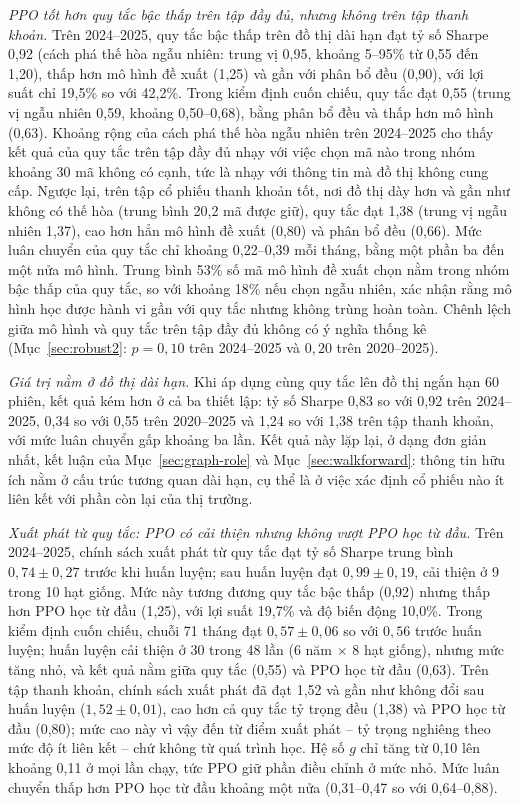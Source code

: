 \textit{PPO tốt hơn quy tắc bậc thấp trên tập đầy đủ, nhưng không trên tập thanh khoản.} Trên 2024--2025, quy tắc bậc thấp trên đồ thị dài hạn đạt tỷ số Sharpe 0,92 (cách phá thế hòa ngẫu nhiên: trung vị 0,95, khoảng 5--95\% từ 0,55 đến 1,20), thấp hơn mô hình đề xuất (1,25) và gần với phân bổ đều (0,90), với lợi suất chỉ 19,5\% so với 42,2\%. Trong kiểm định cuốn chiếu, quy tắc đạt 0,55 (trung vị ngẫu nhiên 0,59, khoảng 0,50--0,68), bằng phân bổ đều và thấp hơn mô hình (0,63). Khoảng rộng của cách phá thế hòa ngẫu nhiên trên 2024--2025 cho thấy kết quả của quy tắc trên tập đầy đủ nhạy với việc chọn mã nào trong nhóm khoảng 30 mã không có cạnh, tức là nhạy với thông tin mà đồ thị không cung cấp. Ngược lại, trên tập cổ phiếu thanh khoản tốt, nơi đồ thị dày hơn và gần như không có thế hòa (trung bình 20,2 mã được giữ), quy tắc đạt 1,38 (trung vị ngẫu nhiên 1,37), cao hơn hẳn mô hình đề xuất (0,80) và phân bổ đều (0,66). Mức luân chuyển của quy tắc chỉ khoảng 0,22--0,39 mỗi tháng, bằng một phần ba đến một nửa mô hình. Trung bình 53\% số mã mô hình đề xuất chọn nằm trong nhóm bậc thấp của quy tắc, so với khoảng 18\% nếu chọn ngẫu nhiên, xác nhận rằng mô hình học được hành vi gần với quy tắc nhưng không trùng hoàn toàn. Chênh lệch giữa mô hình và quy tắc trên tập đầy đủ không có ý nghĩa thống kê (Mục~\ref{sec:robust2}: $p = 0{,}10$ trên 2024--2025 và $0{,}20$ trên 2020--2025).

\textit{Giá trị nằm ở đồ thị dài hạn.} Khi áp dụng cùng quy tắc lên đồ thị ngắn hạn 60 phiên, kết quả kém hơn ở cả ba thiết lập: tỷ số Sharpe 0,83 so với 0,92 trên 2024--2025, 0,34 so với 0,55 trên 2020--2025 và 1,24 so với 1,38 trên tập thanh khoản, với mức luân chuyển gấp khoảng ba lần. Kết quả này lặp lại, ở dạng đơn giản nhất, kết luận của Mục~\ref{sec:graph-role} và Mục~\ref{sec:walkforward}: thông tin hữu ích nằm ở cấu trúc tương quan dài hạn, cụ thể là ở việc xác định cổ phiếu nào ít liên kết với phần còn lại của thị trường.

\textit{Xuất phát từ quy tắc: PPO có cải thiện nhưng không vượt PPO học từ đầu.} Trên 2024--2025, chính sách xuất phát từ quy tắc đạt tỷ số Sharpe trung bình $0{,}74\pm0{,}27$ trước khi huấn luyện; sau huấn luyện đạt $0{,}99\pm0{,}19$, cải thiện ở 9 trong 10 hạt giống. Mức này tương đương quy tắc bậc thấp (0,92) nhưng thấp hơn PPO học từ đầu (1,25), với lợi suất 19,7\% và độ biến động 10,0\%. Trong kiểm định cuốn chiếu, chuỗi 71 tháng đạt $0{,}57\pm0{,}06$ so với $0{,}56$ trước huấn luyện; huấn luyện cải thiện ở 30 trong 48 lần (6 năm $\times$ 8 hạt giống), nhưng mức tăng nhỏ, và kết quả nằm giữa quy tắc (0,55) và PPO học từ đầu (0,63). Trên tập thanh khoản, chính sách xuất phát đã đạt 1,52 và gần như không đổi sau huấn luyện ($1{,}52\pm0{,}01$), cao hơn cả quy tắc tỷ trọng đều (1,38) và PPO học từ đầu (0,80); mức cao này vì vậy đến từ điểm xuất phát -- tỷ trọng nghiêng theo mức độ ít liên kết -- chứ không từ quá trình học. Hệ số $g$ chỉ tăng từ 0,10 lên khoảng 0,11 ở mọi lần chạy, tức PPO giữ phần điều chỉnh ở mức nhỏ. Mức luân chuyển thấp hơn PPO học từ đầu khoảng một nửa (0,31--0,47 so với 0,64--0,88).

